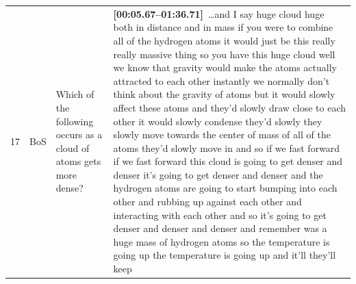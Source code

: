 \documentclass[10pt]{article}
\begin{document}
\begin{tiny}
\begin{longtable}{r p{0.3in} p{1.212in} p{3.8in}}
    17 &          BoS &                                                                                                                                                                                                               Which of the following occurs as a cloud of atoms gets more dense? &                                                                                                                                                                                                                                                                                                                                                                                                                                                                                                                                                                                                                                                                                                                                                                                                                                                                                                                                                                                                                                                                                                                                                                                                                                                                                                                                                                                                                                                                                                                                                                                                                                                                                                                                                                                                                                                                                                                                                                                                                                             \textbf{[00:05.67--01:36.71]}~\ldots and I say huge cloud huge both in distance and in mass if you were to combine all of the hydrogen atoms it would just be this really really massive thing so you have this huge cloud well we know that gravity would make the atoms actually attracted to each other instantly we normally don't think about the gravity of atoms but it would slowly affect these atoms and they'd slowly draw close to each other it would slowly condense they'd slowly they slowly move towards the center of mass of all of the atoms they'd slowly move in and so if we fast forward if we fast forward this cloud is going to get denser and denser it's going to get denser and denser and the hydrogen atoms are going to start bumping into each other and rubbing up against each other and interacting with each other and so it's going to get denser and denser and denser and remember was a huge mass of hydrogen atoms so the temperature is going up the temperature is going up and it'll they'll keep 
\end{longtable}
\end{tiny}
\end{document}
